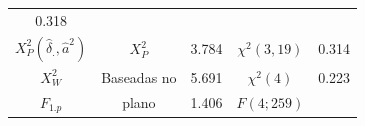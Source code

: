 \documentclass[]{book}
\numberwithin{example}{chapter}
\numberwithin{remark}{chapter}
\numberwithin{definition}{chapter}
\begin{document}
\begin{longtable}[]{@{}cclcr@{}}
\begin{minipage}[t]{0.08\columnwidth}
0.318\strut
\end{minipage}\tabularnewline
\begin{minipage}[t]{0.39\columnwidth}\centering\strut
\(X_{P}^{2}\left( \hat{\delta}_{.},\hat{a}^{2}\right)\)\strut
\end{minipage} & \begin{minipage}[t]{0.15\columnwidth}\centering\strut
\(X_{P}^{2}\)\strut
\end{minipage} & \begin{minipage}[t]{0.05\columnwidth}\raggedright\strut
3.784\strut
\end{minipage} & \begin{minipage}[t]{0.19\columnwidth}\centering\strut
\(\chi ^{2}(3,19)\)\strut
\end{minipage} & \begin{minipage}[t]{0.08\columnwidth}\raggedleft\strut
0.314\strut
\end{minipage}\tabularnewline
\begin{minipage}[t]{0.39\columnwidth}\centering\strut
\(X_{W}^{2}\)\strut
\end{minipage} & \begin{minipage}[t]{0.15\columnwidth}\centering\strut
Baseadas no\strut
\end{minipage} & \begin{minipage}[t]{0.05\columnwidth}\raggedright\strut
5.691\strut
\end{minipage} & \begin{minipage}[t]{0.19\columnwidth}\centering\strut
\(\chi ^{2}(4)\)\strut
\end{minipage} & \begin{minipage}[t]{0.08\columnwidth}\raggedleft\strut
0.223\strut
\end{minipage}\tabularnewline
\begin{minipage}[t]{0.39\columnwidth}\centering\strut
\(F_{1.p}\)\strut
\end{minipage} & \begin{minipage}[t]{0.15\columnwidth}\centering\strut
plano\strut
\end{minipage} & \begin{minipage}[t]{0.05\columnwidth}\raggedright\strut
1.406\strut
\end{minipage} & \begin{minipage}[t]{0.19\columnwidth}\centering\strut
\(F\left( 4;259\right)\)\strut
\end{minipage} & \begin{minipage}[t]{0.08\columnwidth}\raggedleft\strut

\end{minipage}
\end{longtable}
\end{document}
